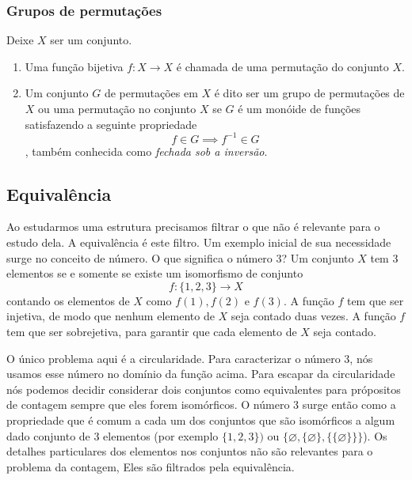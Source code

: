 \subsubsection{Grupos de permutações}
\begin{definition}
  Deixe $X$ ser um conjunto.
  \begin{enumerate}(i.)
    \item Uma função bijetiva $f: X \to X$ é chamada de uma permutação do conjunto $X$.
    \item Um conjunto $G$ de permutações em $X$ é dito ser um grupo de permutações de $X$ ou uma permutação no conjunto $X$ se $G$ é um monóide de funções satisfazendo a seguinte propriedade $$f \in G \implies f^{-1} \in G$$, também conhecida como \emph{fechada sob a inversão}.
  \end{enumerate}
\end{definition}

\subsection{Equivalência}
Ao estudarmos uma estrutura precisamos filtrar o que não é relevante para o estudo dela. A equivalência é este filtro. Um exemplo inicial de sua necessidade surge no conceito de número. O que significa o número 3? Um conjunto $X$ tem 3 elementos se e somente se existe um isomorfismo de conjunto $$f: \{1,2,3\} \to X$$
contando os elementos de $X$ como $f(1), f(2)$ e $f(3)$. A função $f$ tem que ser injetiva, de modo que nenhum elemento de $X$ seja contado duas vezes. A função $f$ tem que ser sobrejetiva, para garantir que cada elemento de $X$ seja contado.

O único problema aqui é a circularidade. Para caracterizar o número 3, nós usamos esse número no domínio da função acima. Para escapar da circularidade nós podemos decidir considerar dois conjuntos como equivalentes para própositos de contagem sempre que eles forem isomórficos. O número 3 surge então como a propriedade que é comum a cada um dos conjuntos que são isomórficos a algum dado conjunto de 3 elementos (por exemplo $\{1,2,3\})$ ou $\{\varnothing , \{\varnothing\} , \{\{\varnothing\}\}\}$). Os detalhes particulares dos elementos nos conjuntos não são relevantes para o problema da contagem, Eles são filtrados pela equivalência.

